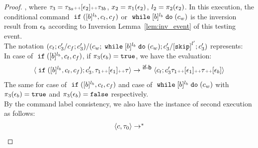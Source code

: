 \begin{proof}
, where $\mathtt{\tau}_3 = \mathtt{\tau}_{3a} {\scriptscriptstyle ++} [\mathtt{\epsilon}_2] {\scriptscriptstyle ++} \mathtt{\tau}_{3b}$,
$x_2 = \pi_1(\mathtt{\epsilon}_2)$, $l_2 = \pi_2(\mathtt{\epsilon}_2)$. 
In this execution, the conditional command $\;\mathtt{if}\; ([b]^{l_b}, c_t, c_f)$ or $\;\mathtt{while}\; [b]^{l_b} \;\mathtt{do}\; (c_w)$ 
is the inversion result from
$\mathtt{\epsilon}_b$ according to Inversion Lemma~\ref{lem:inv_event} of this testing event.
\\
The notation $(c_t;c_3' / c_f;c_3') /(c_w; \ewhile [b]^{l_b} \edo (c_w);c_3' / \clabel{\eskip}^{l'}; c_3')$ represents:
\\
In case of $\;\mathtt{if}\; ([b]^{l_b}, c_t, c_f)$, if $\pi_3(\mathtt{\epsilon}_b) = \mathtt{true}$, we have the evaluation:
$$
\langle \;\mathtt{if}\; ([b]^{l_b}, c_t, c_f) ;{c}_3', 
\mathtt{\tau}_1 {\scriptscriptstyle ++} [\mathtt{\epsilon}_1] {\scriptscriptstyle ++} \mathtt{\tau} \rangle 
 \rightarrow^{\textsf{\small{ if-b}}} 
\langle c_t;c_3' 
\mathtt{\tau}_1 {\scriptscriptstyle ++} [\mathtt{\epsilon}_1] {\scriptscriptstyle ++} \mathtt{\tau} {\scriptscriptstyle ++} [\mathtt{\epsilon}_b] \rangle 
$$
%
The same for case of $\;\mathtt{if}\; ([b]^{l_b}, c_t, c_f)$ 
and case of $\;\mathtt{while}\; [b]^{l_b} \;\mathtt{do}\; (c_w)$ with $\pi_3(\mathtt{\epsilon}_b) = \mathtt{true}$ and $\pi_3(\mathtt{\epsilon}_b) = \mathtt{false}$
respectively.
%
\\
By the command label consistency,
we also have the instance of second execution as follows:
\begin{equation}
\label{eq:ctldep_inv2}
\begin{array}{l}   
  \langle {c}, \mathtt{\tau}_0 \rangle \rightarrow^{*} 

\end{array}
\end{equation}
\end{proof}

